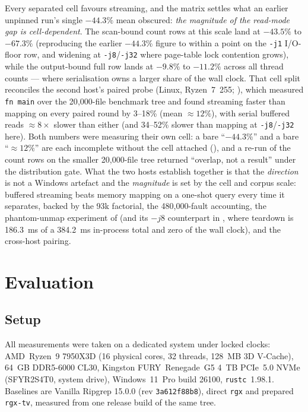 \documentclass[11pt,letterpaper]{article}
\begin{document}
Every separated cell favours streaming, and the matrix settles what an
earlier unpinned run's single $-44.3\%$ mean obscured: \emph{the magnitude
of the read-mode gap is cell-dependent}. The scan-bound count rows at this
scale land at $-43.5\%$ to $-67.3\%$ (reproducing the earlier $-44.3\%$
figure to within a point on the \texttt{-j1} I/O-floor row, and widening at
\texttt{-j8}/\texttt{-j32} where page-table lock contention grows), while
the output-bound full row lands at $-9.8\%$ to $-11.2\%$ across all thread
counts --- where serialisation owns a larger share of the wall clock. That
cell split reconciles the second host's paired probe (Linux, Ryzen~7~255;
), which measured \texttt{fn main} over the
20{,}000-file benchmark tree and found streaming faster than mapping on
every paired round by 3--18\% (mean $\approx 12\%$), with serial buffered
reads $\approx 8\times$ slower than either (and 34--52\% slower than
mapping at \texttt{-j8}/\texttt{-j32} here). Both numbers were measuring
their own cell: a bare ``$-44.3\%$'' and a bare ``$\approx 12\%$'' are each
incomplete without the cell attached (), and a re-run of
the count rows on the smaller 20{,}000-file tree returned ``overlap, not a
result'' under the distribution gate. What the two hosts establish together
is that the \emph{direction} is not a Windows artefact and the
\emph{magnitude} is set by the cell and corpus scale: buffered streaming
beats memory mapping on a one-shot query every time it separates, backed by
the 93k factorial, the 480{,}000-fault accounting, the phantom-unmap
experiment of  (and its $-j8$ counterpart in
, where teardown is 186.3~ms of a
384.2~ms in-process total and zero of the wall clock), and the cross-host
pairing.

\section{Evaluation}
\label{sec:eval}

\subsection{Setup}
All measurements were taken on a dedicated system under locked clocks:
AMD~Ryzen~9 7950X3D (16 physical cores, 32 threads, 128~MB 3D V-Cache),
64~GB DDR5-6000 CL30, Kingston FURY~Renegade~G5 4~TB PCIe~5.0 NVMe
(SFYR2S4T0, system drive), Windows~11~Pro build 26100,
\texttt{rustc}~1.98.1. Baselines are Vanilla Ripgrep 15.0.0
(rev \texttt{3a612f88b8}), direct \texttt{rgx} and prepared
\texttt{rgx-tv}, measured from one release build of the same tree.
\end{document}
